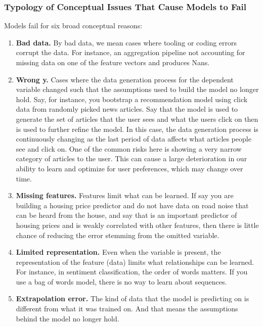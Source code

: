 \documentclass[12pt, letterpaper]{article}
\begin{document}
\subsubsection{Typology of Conceptual Issues That Cause Models to Fail}

Models fail for six broad conceptual reasons:

\begin{enumerate}

    \item \textbf{Bad data.} By bad data, we mean cases where tooling or coding errors corrupt the data. For instance, an aggregation pipeline not accounting for missing data on one of the feature vectors and produces Nans.

    \item \textbf{Wrong y.} Cases where the data generation process for the dependent variable changed such that the assumptions used to build the model no longer hold. Say, for instance, you bootstrap a recommendation model using click data from randomly picked news articles. Say that the model is used to generate the set of articles that the user sees and what the users click on then is used to further refine the model. In this case, the data generation process is continuously changing as the last period of data affects what articles people see and click on. One of the common risks here is showing a very narrow category of articles to the user. This can cause a large deterioration in our ability to learn and optimize for user preferences, which may change over time.

    \item \textbf{Missing features.} Features limit what can be learned. If say you are building a housing price predictor and do not have data on road noise that can be heard from the house, and say that is an important predictor of housing prices and is weakly correlated with other features, then there is little chance of reducing the error stemming from the omitted variable.

    \item \textbf{Limited representation.} Even when the variable is present, the representation of the feature (data) limits what relationships can be learned. For instance, in sentiment classification, the order of words matters. If you use a bag of words model, there is no way to learn about sequences.
    
    \item \textbf{Extrapolation error.} The kind of data that the model is predicting on is different from what it was trained on. And that means the assumptions behind the model no longer hold.


\end{enumerate}
\end{document}
